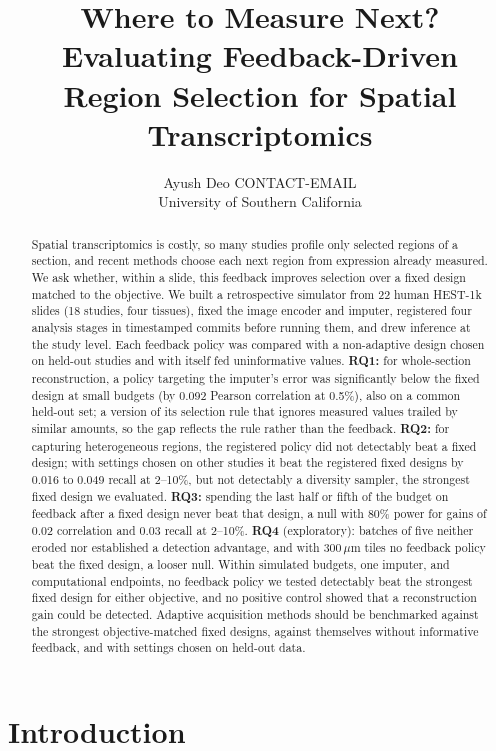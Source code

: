 \documentclass[10pt]{article}
\title{Where to Measure Next? Evaluating Feedback-Driven\\Region Selection for Spatial Transcriptomics}
\author{\name Ayush Deo \email CONTACT-EMAIL \\
      \addr University of Southern California}
\begin{document}
\maketitle

\begin{abstract}
Spatial transcriptomics is costly, so many studies profile only selected regions of a section, and recent methods
choose each next region from expression already measured. We ask whether, within a slide, this feedback improves
selection over a fixed design matched to the objective. We built a retrospective simulator from 22 human HEST-1k
slides (18 studies, four tissues), fixed the image encoder and imputer, registered four analysis stages in
timestamped commits before running them, and drew inference at the study level. Each feedback policy was compared
with a non-adaptive design chosen on held-out studies and with itself fed uninformative values. \textbf{RQ1:} for
whole-section reconstruction, a policy targeting the imputer's error was significantly below the fixed design at
small budgets (by 0.092 Pearson correlation at 0.5\%), also on a common held-out set; a version of its selection rule
that ignores measured values trailed by similar amounts, so the gap reflects the rule rather than the feedback.
\textbf{RQ2:} for capturing heterogeneous regions, the registered policy did not detectably beat a fixed design;
with settings chosen on other studies it beat the registered fixed designs by 0.016 to 0.049 recall at 2--10\%, but
not detectably a diversity sampler, the strongest fixed design we evaluated. \textbf{RQ3:} spending the last half or
fifth of the budget on feedback after a fixed design never beat that design, a null with 80\% power for gains of
0.02 correlation and 0.03 recall at 2--10\%. \textbf{RQ4} (exploratory): batches of five neither eroded nor
established a detection advantage, and with 300\,$\mu$m tiles no feedback policy beat the fixed design, a looser
null. Within simulated budgets, one imputer, and computational endpoints, no feedback policy we tested detectably
beat the strongest fixed design for either objective, and no positive control showed that a reconstruction gain
could be detected. Adaptive acquisition methods should be benchmarked against the strongest objective-matched fixed
designs, against themselves without informative feedback, and with settings chosen on held-out data.
\end{abstract}

\section{Introduction}
\end{document}
